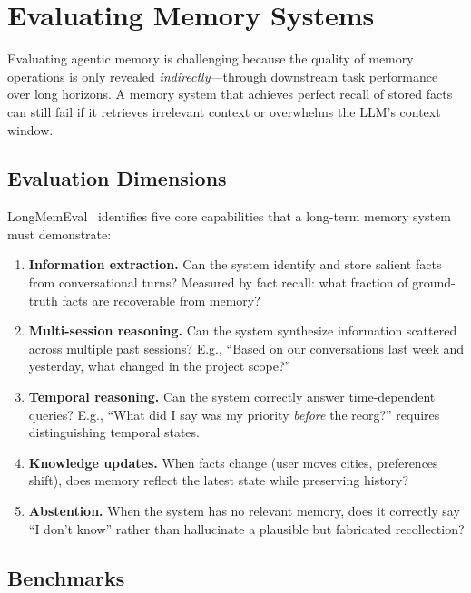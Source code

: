 \section{Evaluating Memory Systems}
\label{sec:memory-evaluation}

Evaluating agentic memory is challenging because the quality of memory operations is only revealed \emph{indirectly}---through downstream task performance over long horizons. A memory system that achieves perfect recall of stored facts can still fail if it retrieves irrelevant context or overwhelms the LLM’s context window.

\subsection{Evaluation Dimensions}
\label{evaluation-dimensions}

LongMemEval~\cite{wu2024longmemeval} identifies five core capabilities that a long-term memory system must demonstrate:

\begin{enumerate}
  \item \textbf{Information extraction.} Can the system identify and store salient facts from conversational turns? Measured by fact recall: what fraction of ground-truth facts are recoverable from memory?
  \item \textbf{Multi-session reasoning.} Can the system synthesize information scattered across multiple past sessions? E.g., ``Based on our conversations last week and yesterday, what changed in the project scope?''
  \item \textbf{Temporal reasoning.} Can the system correctly answer time-dependent queries? E.g., ``What did I say was my priority \emph{before} the reorg?'' requires distinguishing temporal states.
  \item \textbf{Knowledge updates.} When facts change (user moves cities, preferences shift), does memory reflect the latest state while preserving history?
  \item \textbf{Abstention.} When the system has no relevant memory, does it correctly say ``I don’t know'' rather than hallucinate a plausible but fabricated recollection?
\end{enumerate}

\subsection{Benchmarks}
\label{benchmarks}

